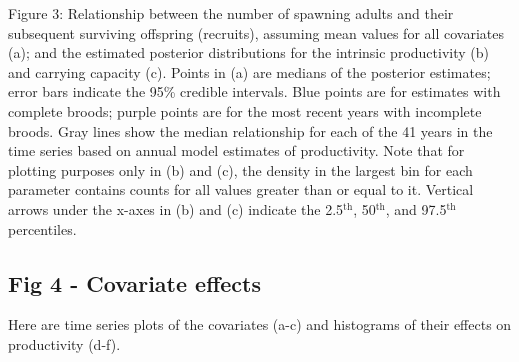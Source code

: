 \documentclass[
  11pt,
]{article}
\begin{document}
Figure 3: Relationship between the number of spawning adults and their
subsequent surviving offspring (recruits), assuming mean values for all
covariates (a); and the estimated posterior distributions for the
intrinsic productivity (b) and carrying capacity (c). Points in (a) are
medians of the posterior estimates; error bars indicate the 95\%
credible intervals. Blue points are for estimates with complete broods;
purple points are for the most recent years with incomplete broods. Gray
lines show the median relationship for each of the 41 years in the time
series based on annual model estimates of productivity. Note that for
plotting purposes only in (b) and (c), the density in the largest bin
for each parameter contains counts for all values greater than or equal
to it. Vertical arrows under the x-axes in (b) and (c) indicate the
2.5\(^\text{th}\), 50\(^\text{th}\), and 97.5\(^\text{th}\) percentiles.

\hypertarget{fig-4---covariate-effects}{%
\subsection{Fig 4 - Covariate effects}\label{fig-4---covariate-effects}}

Here are time series plots of the covariates (a-c) and histograms of
their effects on productivity (d-f).
\end{document}
